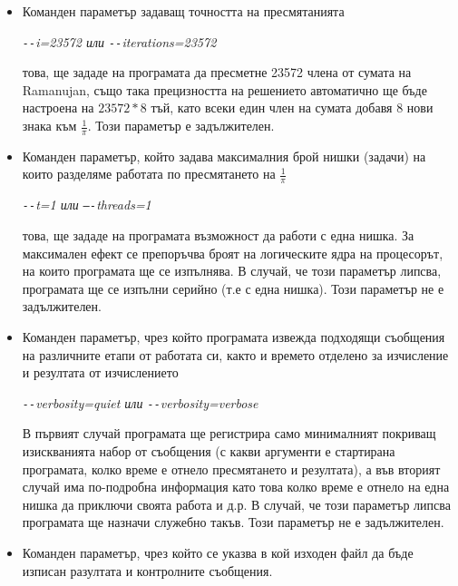 \documentclass[a4paper,english]{article}
\begin{document}
\begin{itemize}
    \item Команден параметър задаващ точността на пресмятанията 
    
    \begin{center}
    \textit {\texttt{-{}-}i=23572 или \texttt{-{}-}iterations=23572}
    \end{center}
    
    това, ще зададе на програмата да пресметне 23572 члена от сумата на Ramanujan, също така прецизността на решението автоматично ще бъде настроена на \begin{math}23572 * 8\end{math} тъй, като всеки един член на сумата добавя 8 нови знака към \begin{math}\frac{1}{\pi}\end{math}. Този параметър е задължителен.
    \item Команден параметър, който задава максималния брой нишки (задачи) на които разделяме работата по пресмятането на \begin{math}\frac{1}{\pi}\end{math}
    
    \begin{center}
        \textit{\texttt{-{}-}t=1 или \texttt{–{}-}threads=1}
    \end{center} 
    
    това, ще зададе на програмата възможност да работи с една нишка. За максимален ефект се препоръчва броят на логическите ядра на процесорът, на които програмата ще се изпълнява. В случай, че този параметър липсва, програмата ще се изпълни серийно (т.е с една нишка). Този параметър не е задължителен.
    \item Команден параметър, чрез който програмата извежда подходящи съобщения на различните етапи от работата си, както и времето отделено за изчисление и резултата от изчислението 
    
    \begin{center}
        \textit{\texttt{-{}-}verbosity=quiet или \texttt{-{}-}verbosity=verbose}
    \end{center}
    
    В първият случай програмата ще регистрира само минималният покриващ изискванията набор от съобщения (с какви аргументи е стартирана програмата, колко време е отнело пресмятането и резултата), а във вторият случай има по-подробна информация като това колко време е отнело на една нишка да приключи своята работа и д.р. В случай, че този параметър липсва програмата ще назначи служебно такъв. Този параметър не е задължителен.
    \item  Команден параметър, чрез който се указва в кой изходен файл да бъде изписан разултата и контролните съобщения. 
    

\end{itemize}
\end{document}
